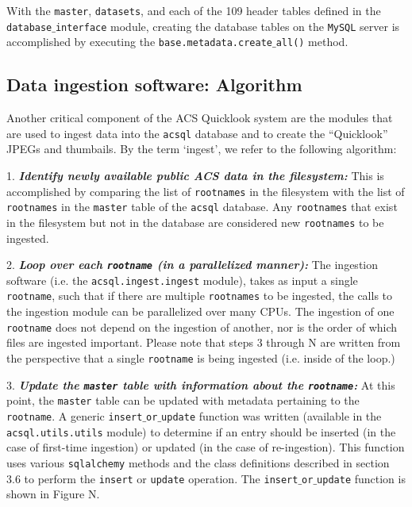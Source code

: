 \documentclass[10pt,journal,compsoc]{IEEEtran}
\begin{document}
With the \texttt{master}, \texttt{datasets}, and each of the 109 header tables defined in the
\texttt{database$\_$interface} module, creating the database tables on the \texttt{MySQL} server
is accomplished by executing the \texttt{base.metadata.create$\_$all()} method.


\subsection{Data ingestion software: Algorithm}

Another critical component of the ACS Quicklook system are the modules that are used to ingest
data into the \texttt{acsql} database and to create the ``Quicklook'' JPEGs and thumbails.
By the term `ingest', we refer to the following algorithm:

1. \textbf{\textit{Identify newly available public ACS data in the filesystem:}}  This is accomplished by
comparing the list of \texttt{rootnames} in the filesystem with the list of \texttt{rootnames}
in the \texttt{master} table of the \texttt{acsql} database.  Any \texttt{rootnames} that
exist in the filesystem but not in the database are considered new \texttt{rootnames} to
be ingested.

2. \textbf{\textit{Loop over each \texttt{rootname} (in a parallelized manner):}}  The ingestion
software (i.e. the \texttt{acsql.ingest.ingest} module), takes as input a single
\texttt{rootname}, such that if there are multiple \texttt{rootnames} to be ingested, the
calls to the ingestion module can be parallelized over many CPUs.  The ingestion of one
\texttt{rootname} does not depend on the ingestion of another, nor is the order of which
files are ingested important.  Please note that steps 3 through N are written from the
perspective that a single \texttt{rootname} is being ingested (i.e. inside of the loop.)

3. \textbf{\textit{Update the \texttt{master} table with information about the \texttt{rootname}:}}
At this point, the \texttt{master} table can be updated with metadata pertaining to the
\texttt{rootname}.  A generic \texttt{insert$\_$or$\_$update} function was written
(available in the \texttt{acsql.utils.utils} module) to determine if an entry should be
inserted (in the case of first-time ingestion) or updated (in the case of re-ingestion).
This function uses various \texttt{sqlalchemy} methods and the class definitions described
in section 3.6 to perform the \texttt{insert} or \texttt{update} operation.  The
\texttt{insert$\_$or$\_$update} function is shown in Figure N.
\end{document}
